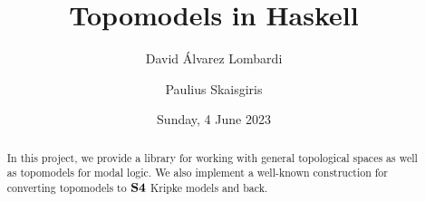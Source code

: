 \documentclass[12pt,a4paper]{article}
\title{Topomodels in Haskell}
\author{David Álvarez Lombardi \and Paulius Skaisgiris}
\date{Sunday, 4 June 2023}
\begin{document}
\maketitle

\begin{abstract}
In this project, we provide a library for working with general topological spaces as well as topomodels for modal logic.
We also implement a well-known construction for converting topomodels to $\mathbf{S4}$ Kripke models and back.
\end{abstract}

\tableofcontents

\clearpage




























\end{document}
